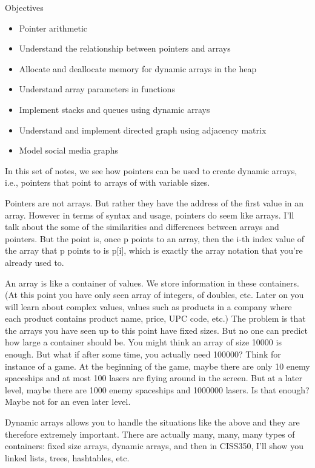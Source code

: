 \documentclass[
]{article}
\author{}
\date{}
\providecommand{\tightlist}{%
  \setlength{\itemsep}{0pt}\setlength{\parskip}{0pt}}
\begin{document}
Objectives

\begin{itemize}
\tightlist
\item
  Pointer arithmetic
\item
  Understand the relationship between pointers and arrays
\item
  Allocate and deallocate memory for dynamic arrays in the heap
\item
  Understand array parameters in functions
\item
  Implement stacks and queues using dynamic arrays
\item
  Understand and implement directed graph using adjacency matrix
\item
  Model social media graphs
\end{itemize}

In this set of notes, we see how pointers can be used to create dynamic
arrays, i.e., pointers that point to arrays of with variable sizes.

Pointers are not arrays. But rather they have the address of the first
value in an array. However in terms of syntax and usage, pointers do
seem like arrays. I'll talk about the some of the similarities and
differences between arrays and pointers. But the point is, once p points
to an array, then the i-th index value of the array that p points to is
p{[}i{]}, which is exactly the array notation that you're already used
to.

An array is like a container of values. We store information in these
containers. (At this point you have only seen array of integers, of
doubles, etc. Later on you will learn about complex values, values such
as products in a company where each product contains product name,
price, UPC code, etc.) The problem is that the arrays you have seen up
to this point have fixed sizes. But no one can predict how large a
container should be. You might think an array of size 10000 is enough.
But what if after some time, you actually need 100000? Think for
instance of a game. At the beginning of the game, maybe there are only
10 enemy spaceships and at most 100 lasers are flying around in the
screen. But at a later level, maybe there are 1000 enemy spaceships and
1000000 lasers. Is that enough? Maybe not for an even later level.

Dynamic arrays allows you to handle the situations like the above and
they are therefore extremely important. There are actually many, many,
many types of containers: fixed size arrays, dynamic arrays, and then in
CISS350, I'll show you linked lists, trees, hashtables, etc.
\end{document}
